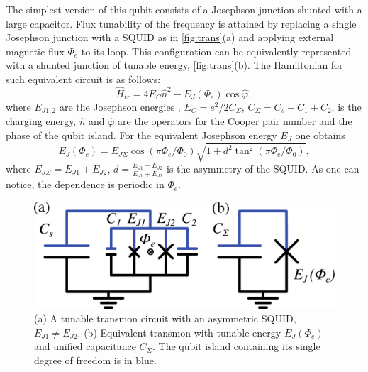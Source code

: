 \documentclass[%
 aip,
 amsmath,amssymb,
 reprint,%
]{revtex4-1}
\begin{document}
The simplest version of this qubit consists of a Josephson junction shunted with a large capacitor. Flux tunability of the frequency is attained by replacing a single Josephson junction with a SQUID as in \autoref{fig:trans}(a) and applying external magnetic flux $\Phi_e$ to its loop. This configuration can be equivalently represented with a shunted junction of tunable energy, \autoref{fig:trans}(b). The Hamiltonian for such equivalent circuit is as follows: 
\begin{equation}
\hat{H}_{tr} = 4E_C \hat n^2 - E_J(\Phi_e) \cos \hat\varphi,
\label{eq:tr_ham}
\end{equation}
where $E_{J1,2}$ are the Josephson energies , $E_C = e^2/2C_{\Sigma}$, $C_{\Sigma} = C_s + C_1 +C_2$, is the charging energy, $\hat n$ and $\hat \varphi$ are the operators for the Cooper pair number and the phase of the qubit island. For the equivalent Josephson energy $E_{J}$ one obtains
\begin{equation}
E_{J}(\Phi_e) = E_{J\Sigma}\cos\left(\pi \Phi_e/\Phi_0\right) \sqrt{1+d^2 \tan^2 \left(\pi \Phi_e/\Phi_0\right)},
\label{eq:EJ_Phie}
\end{equation}  
where $E_{J\Sigma} = E_{J1}+E_{J2}$, $d = \frac{E_{J1}-E_{J2}}{E_{J1}+E_{J2}}$ is the asymmetry of the SQUID. As one can notice, the dependence is periodic in $\Phi_e$.
\begin{figure}
	\centering
	\includegraphics[width=\linewidth]{transmon}
	\caption{(a) A tunable transmon circuit with an asymmetric SQUID, $E_{J1} \neq E_{J2}$. (b) Equivalent transmon with tunable energy $E_{J}(\Phi_e)$ and unified capacitance $C_{\Sigma}$. The qubit island containing its single degree of freedom is in blue.}
	\label{fig:trans}
\end{figure}
\end{document}
